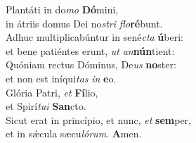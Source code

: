 \oddverse Plantáti in do\textit{mo} \textbf{Dó}mini,~\*\\
\oddverse in átriis domus Dei no\textit{stri} \textit{flo}\textbf{ré}bunt.\\
\evenverse Adhuc multiplicabúntur in sené\textit{cta} \textbf{ú}beri:~\*\\
\evenverse et bene patiéntes erunt, \textit{ut} \textit{an}\textbf{nún}tient:\\
\oddverse Quóniam rectus Dóminus, De\textit{us} \textbf{no}ster:~\*\\
\oddverse et non est iníqui\textit{tas} \textit{in} \textbf{e}o.\\
\evenverse Glória Patri, \textit{et} \textbf{Fí}lio,~\*\\
\evenverse et Spirí\textit{tu}\textit{i} \textbf{San}cto.\\
\oddverse Sicut erat in princípio, et nunc, \textit{et} \textbf{sem}per,~\*\\
\oddverse et in sǽcula sæcu\textit{ló}\textit{rum}. \textbf{A}men.\\
